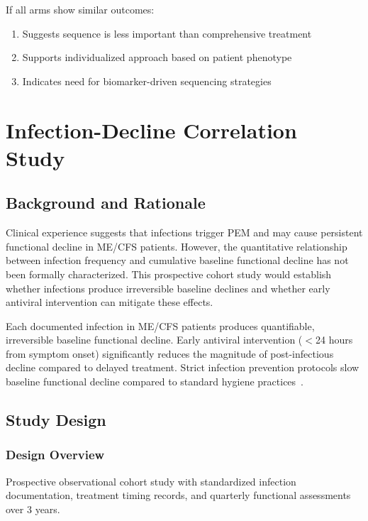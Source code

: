 If all arms show similar outcomes:
\begin{enumerate}
    \item Suggests sequence is less important than comprehensive treatment
    \item Supports individualized approach based on patient phenotype
    \item Indicates need for biomarker-driven sequencing strategies
\end{enumerate}

\section{Infection-Decline Correlation Study}
\label{sec:infection-decline-study}

\subsection{Background and Rationale}

Clinical experience suggests that infections trigger PEM and may cause persistent functional decline in ME/CFS patients. However, the quantitative relationship between infection frequency and cumulative baseline functional decline has not been formally characterized. This prospective cohort study would establish whether infections produce irreversible baseline declines and whether early antiviral intervention can mitigate these effects.

\begin{hypothesis}
\label{hyp:infection-induced-decline}
Each documented infection in ME/CFS patients produces quantifiable, irreversible baseline functional decline. Early antiviral intervention ($<$24 hours from symptom onset) significantly reduces the magnitude of post-infectious decline compared to delayed treatment. Strict infection prevention protocols slow baseline functional decline compared to standard hygiene practices~\cite{NIH2024MECFSRoadmap}.
\end{hypothesis}

\subsection{Study Design}

\subsubsection{Design Overview}
Prospective observational cohort study with standardized infection documentation, treatment timing records, and quarterly functional assessments over 3 years.

